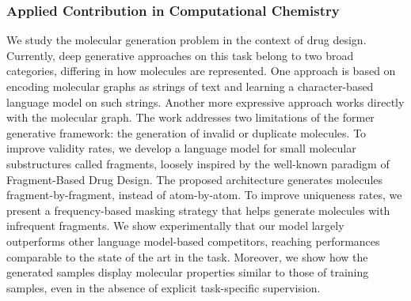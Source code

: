 \subsubsection*{Applied Contribution in Computational Chemistry}
We study the molecular generation problem in the context of drug design. Currently, deep generative approaches on this task belong to two broad categories, differing in how molecules are represented. One approach is based on encoding molecular graphs as strings of text and learning a character-based language model on such strings. Another more expressive approach works directly with the molecular graph. The work addresses two limitations of the former generative framework: the generation of invalid or duplicate molecules. To improve validity rates, we develop a language model for small molecular substructures called fragments, loosely inspired by the well-known paradigm of Fragment-Based Drug Design. The proposed architecture generates molecules fragment-by-fragment, instead of atom-by-atom. To improve uniqueness rates, we present a frequency-based masking strategy that helps generate molecules with infrequent fragments. We show experimentally that our model largely outperforms other language model-based competitors, reaching performances comparable to the state of the art in the task. Moreover, we show how the generated samples display molecular properties similar to those of training samples, even in the absence of explicit task-specific supervision.


